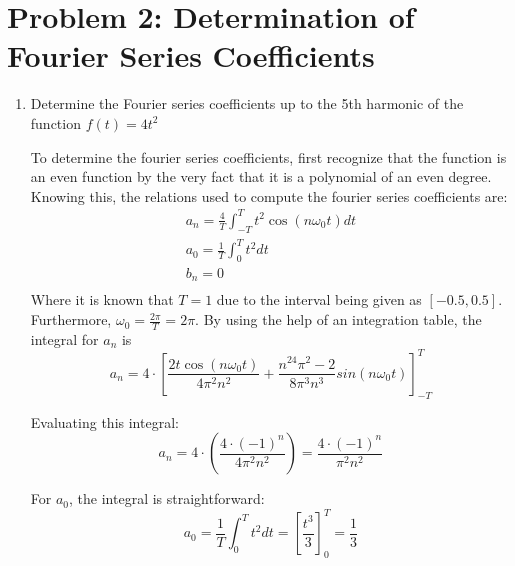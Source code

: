 \section{Problem 2: Determination of Fourier Series Coefficients}
\begin{enumerate}
    \item Determine the Fourier series coefficients up to the 5th harmonic of the function $f(t) = 4t^2$

          To determine the fourier series coefficients, first recognize that the function is an even function by the very fact that it is a polynomial of an even degree. Knowing this, the relations used to compute the fourier series coefficients are:
          \begin{equation}
              \begin{gathered}
                  a_n = \frac{4}{T}\int_{-T}^{T}t^2 \cos(n\omega_0t) dt \\
                  a_0 = \frac{1}{T}\int_{0}^{T}t^2 dt \\
                  b_n = 0 \\
              \end{gathered}
          \end{equation}
          Where it is known that $T = 1$ due to the interval being given as $[-0.5, 0.5]$. Furthermore, $\omega_0 = \frac{2\pi}{T} = 2\pi$. By using the help of an integration table, the integral for $a_n$ is
          \begin{equation}
              a_n = 4\cdot \left[
                  \frac{2t \cos(n\omega_0t)}{4\pi^2n^2} + \frac{n^24\pi^2 - 2}{8\pi^3n^3}sin(n\omega_0t)
                  \right]_{-T}^{T}
          \end{equation}

          Evaluating this integral:
          \begin{equation}
              a_n = 4 \cdot \left(\frac{4 \cdot (-1)^n}{4\pi^2n^2}\right)
              = \frac{4 \cdot (-1)^n}{\pi^2n^2}
          \end{equation}

          For $a_0$, the integral is straightforward:
          \begin{equation}
              a_0 = \frac{1}{T}\int_{0}^{T}t^2 dt = \left[\frac{t^3}{3}\right]_{0}^{T} = \frac{1}{3}
          \end{equation}


\end{enumerate}
